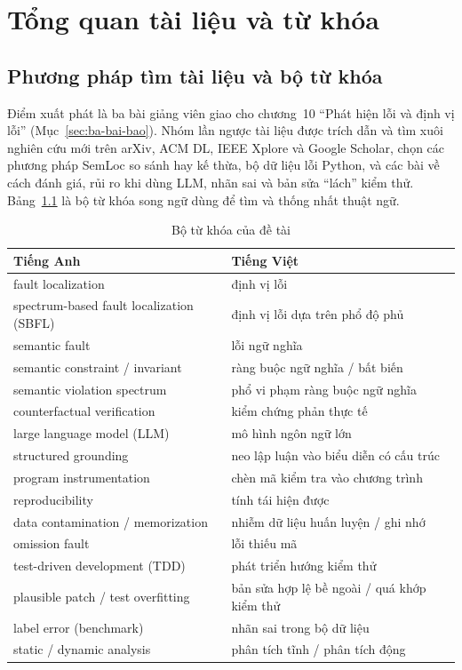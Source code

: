\chapter{Tổng quan tài liệu và từ khóa}
\label{chap:tong-quan}

\section{Phương pháp tìm tài liệu và bộ từ khóa}
\label{sec:tim-tai-lieu}

Điểm xuất phát là ba bài giảng viên giao cho chương~10 ``Phát hiện lỗi và định vị lỗi'' (Mục~\ref{sec:ba-bai-bao}).
Nhóm lần ngược tài liệu được trích dẫn và tìm xuôi nghiên cứu mới trên arXiv, ACM DL, IEEE Xplore và Google Scholar,
chọn các phương pháp SemLoc so sánh hay kế thừa, bộ dữ liệu lỗi Python, và các bài về cách đánh giá, rủi ro khi dùng LLM,
nhãn sai và bản sửa ``lách'' kiểm thử. Bảng~\ref{tab:tu-khoa} là bộ từ khóa song ngữ dùng để tìm và thống nhất thuật ngữ.

\begin{table}[H]
\centering
\caption{Bộ từ khóa của đề tài}
\label{tab:tu-khoa}
\small
\begin{tabular}{@{}ll@{}}
\toprule
Tiếng Anh & Tiếng Việt \\
\midrule
fault localization & định vị lỗi \\
spectrum-based fault localization (SBFL) & định vị lỗi dựa trên phổ độ phủ \\
semantic fault & lỗi ngữ nghĩa \\
semantic constraint / invariant & ràng buộc ngữ nghĩa / bất biến \\
semantic violation spectrum & phổ vi phạm ràng buộc ngữ nghĩa \\
counterfactual verification & kiểm chứng phản thực tế \\
large language model (LLM) & mô hình ngôn ngữ lớn \\
structured grounding & neo lập luận vào biểu diễn có cấu trúc \\
program instrumentation & chèn mã kiểm tra vào chương trình \\
reproducibility & tính tái hiện được \\
data contamination / memorization & nhiễm dữ liệu huấn luyện / ghi nhớ \\
omission fault & lỗi thiếu mã \\
test-driven development (TDD) & phát triển hướng kiểm thử \\
plausible patch / test overfitting & bản sửa hợp lệ bề ngoài / quá khớp kiểm thử \\
label error (benchmark) & nhãn sai trong bộ dữ liệu \\
static / dynamic analysis & phân tích tĩnh / phân tích động \\
\bottomrule
\end{tabular}
\end{table}

